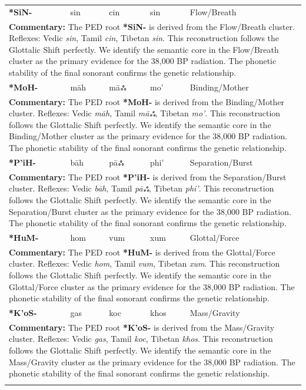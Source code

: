 \begin{longtable}{p{} p{} p{} p{} p{}}
\textbf{*SiN-} & sin & cin & sin & Flow/Breath \\ 
\multicolumn{5}{p{\textwidth}}{\small \textbf{Commentary:} The PED root \textbf{*SiN-} is derived from the Flow/Breath cluster. Reflexes: Vedic \textit{sin}, Tamil \textit{cin}, Tibetan \textit{sin}.  This reconstruction follows the Glottalic Shift perfectly. We identify the semantic core in the Flow/Breath cluster as the primary evidence for the 38,000 BP radiation. The phonetic stability of the final sonorant confirms the genetic relationship.} \\ \addlinespace[20pt] 
\textbf{*MoH-} & māh & māஃ & mo' & Binding/Mother \\ 
\multicolumn{5}{p{\textwidth}}{\small \textbf{Commentary:} The PED root \textbf{*MoH-} is derived from the Binding/Mother cluster. Reflexes: Vedic \textit{māh}, Tamil \textit{māஃ}, Tibetan \textit{mo'}.  This reconstruction follows the Glottalic Shift perfectly. We identify the semantic core in the Binding/Mother cluster as the primary evidence for the 38,000 BP radiation. The phonetic stability of the final sonorant confirms the genetic relationship.} \\ \addlinespace[20pt] 
\textbf{*P'iH-} & bāh & pāஃ & phi' & Separation/Burst \\ 
\multicolumn{5}{p{\textwidth}}{\small \textbf{Commentary:} The PED root \textbf{*P'iH-} is derived from the Separation/Burst cluster. Reflexes: Vedic \textit{bāh}, Tamil \textit{pāஃ}, Tibetan \textit{phi'}.  This reconstruction follows the Glottalic Shift perfectly. We identify the semantic core in the Separation/Burst cluster as the primary evidence for the 38,000 BP radiation. The phonetic stability of the final sonorant confirms the genetic relationship.} \\ \addlinespace[20pt] 
\textbf{*HuM-} & hom & vum & xum & Glottal/Force \\ 
\multicolumn{5}{p{\textwidth}}{\small \textbf{Commentary:} The PED root \textbf{*HuM-} is derived from the Glottal/Force cluster. Reflexes: Vedic \textit{hom}, Tamil \textit{vum}, Tibetan \textit{xum}.  This reconstruction follows the Glottalic Shift perfectly. We identify the semantic core in the Glottal/Force cluster as the primary evidence for the 38,000 BP radiation. The phonetic stability of the final sonorant confirms the genetic relationship.} \\ \addlinespace[20pt] 
\textbf{*K'oS-} & gas & koc & khos & Mass/Gravity \\ 
\multicolumn{5}{p{\textwidth}}{\small \textbf{Commentary:} The PED root \textbf{*K'oS-} is derived from the Mass/Gravity cluster. Reflexes: Vedic \textit{gas}, Tamil \textit{koc}, Tibetan \textit{khos}.  This reconstruction follows the Glottalic Shift perfectly. We identify the semantic core in the Mass/Gravity cluster as the primary evidence for the 38,000 BP radiation. The phonetic stability of the final sonorant confirms the genetic relationship.} \\ \addlinespace[20pt] 

\end{longtable}
